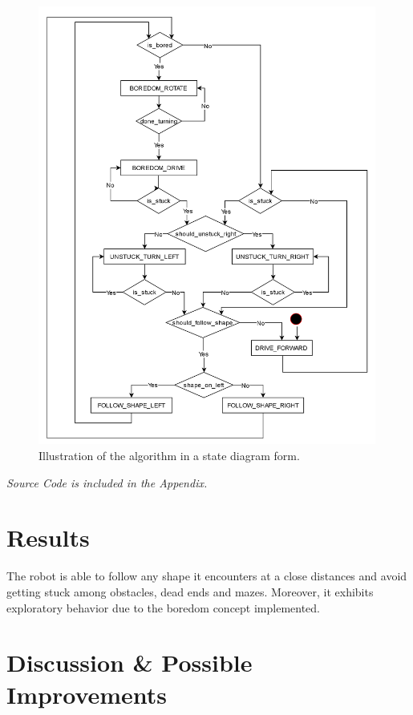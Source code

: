 \documentclass[11pt, a4paper]{article}
\begin{document}
\begin{figure}[h]
  \begin{center}
    \includegraphics[width=30em]{../assets/state-diagram.png}
    \caption{Illustration of the algorithm in a state diagram form.}
  \end{center}
\end{figure}

\begin{center}
  \emph{Source Code is included in the Appendix.}
\end{center}




\newpage
\section{Results}

The robot is able to follow any shape it encounters at a close distances and 
avoid getting stuck among obstacles, dead ends and mazes. Moreover, it exhibits 
exploratory behavior due to the boredom concept implemented.


\section{Discussion \& Possible Improvements}
\end{document}
